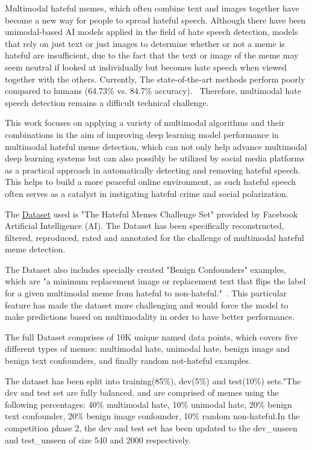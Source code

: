 \documentclass[10pt,twocolumn,letterpaper]{article}
\begin{document}
Multimodal hateful memes, which often combine text and images together have become a new way for people to spread hateful speech. Although there have been unimodal-based AI models applied in the field of hate speech detection, models that rely on just text or just images to determine whether or not a meme is hateful are insufficient, due to the fact that the text or image of the meme may seem neutral if looked at individually but becomes hate speech when viewed together with the others. Currently, The state-of-the-art methods perform poorly compared to humans (64.73\% vs. 84.7\% accuracy).~\cite{Authors1} Therefore, multimodal hate speech detection remains a difficult technical challenge.

This work focuses on applying a variety of multimodal algorithms and their combinations in the aim of improving deep learning  model performance in multimodal hateful meme detection, which can not only help advance multimodal deep learning systems but can also possibly be utilized by social media platforms as a practical approach in automatically detecting and removing hateful speech. This helps to build a more peaceful online environment, as such hateful speech often serves as a catalyst in instigating hateful crime and social polarization.

The \href{https://www.drivendata.org/competitions/64/hateful-memes/data/}{Dataset} used is "The Hateful Memes Challenge Set" provided by Facebook Artificial Intelligence (AI). The Dataset has been specifically reconstructed, filtered, reproduced, rated and annotated for the challenge of multimodal hateful meme detection.~\cite{Authors2}

The Dataset also includes specially created "Benign Confounders" examples, which are "a minimum replacement image or replacement text that flips the label for a given multimodal meme from hateful to non-hateful."~\cite{Authors2}. This particular feature has made the dataset more challenging and would force the model to make predictions based on multimodality in order to have better performance.

The full Dataset comprises of 10K unique named data points, which covers five different types of memes: multimodal hate, unimodal hate, benign image and benign text confounders, and finally random not-hateful examples. 
~\cite{Authors2}

The dataset has been split into training(85\%), dev(5\%) and test(10\%) sets."The dev and test set are fully balanced, and are comprised of memes using the following percentages: 40\% multimodal hate, 10\% unimodal hate, 20\% benign text confounder, 20\% benign image confounder, 10\% random non-hateful.In the competition phase 2, the dev and test set has been updated to the dev\_unseen and test\_unseen of size 540 and 2000 respectively.
\end{document}
